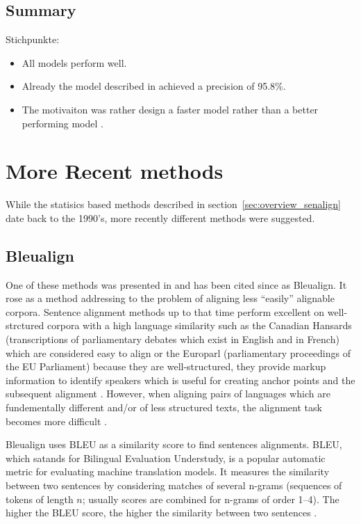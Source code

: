 \subsection{Summary}
Stichpunkte:
\begin{itemize}
	\item All models perform well.
	\item Already the model described in \cite{gale-church-1991-program} achieved a precision of 95.8\%.
	\item The motivaiton was rather design a faster model rather than a better performing model \autocite{chen-1993-aligning}.
\end{itemize}


\section{More Recent methods}
While the statisics based methods described in section~\ref{sec:overview_senalign} date back to the 1990's, more recently different methods were suggested.

\subsection{Bleualign}

One of these methods was presented in \cite{sennrich-volk-2010-mt} and has been cited since as Bleualign. 
It rose as a method addressing to the problem of aligning less \enquote{easily} alignable corpora. 
Sentence alignment methods up to that time perform excellent on well-strctured corpora with a high language similarity such as the Canadian Hansards (transcriptions of parliamentary debates which exist in English and in French) which are considered easy to align  or the Europarl (parliamentary proceedings of the EU Parliament) because they are well-structured, they provide markup information to identify speakers which is useful for creating anchor points and the subsequent alignment \autocites{simard-plamondon-1996-bilingual,sennrich-volk-2011-iterative}. 
However, when aligning pairs of languages which are fundementally different and/or of less structured texts, the alignment task becomes more difficult \autocite{sennrich-volk-2010-mt}.

Bleualign uses BLEU as a similarity score to find sentences alignments. 
BLEU, which satands for Bilingual Evaluation Understudy, is a popular automatic metric for evaluating machine translation models. It measures the similarity between two sentences by considering matches of several n-grams (sequences of tokens of length \(n\); usually scores are combined for n-grams of order 1--4). 
The higher the BLEU score, the higher the similarity between two sentences \autocite[226]{koehn2009}.


